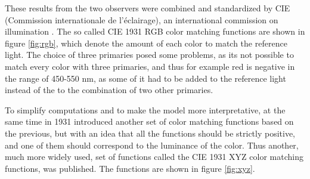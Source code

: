 These results from the two observers were combined and standardized by CIE (Commission internationale de l'éclairage), an international commission on illumination \cite{CIE}. The so called CIE 1931 RGB color matching functions are shown in figure \ref{fig:rgb}, which denote the amount of each color to match the reference light. The choice of three primaries posed some problems, as its not possible to match every color with three primaries, and thus for example red is negative in the range of 450-550 nm, as some of it had to be added to the reference light instead of the to the combination of two other primaries. \cite{measuringcolour}

To simplify computations and to make the model more interpretative, at the same time in 1931 introduced another set of color matching functions based on the previous, but with an idea that all the functions should be strictly positive, and one of them should correspond to the luminance of the color. Thus another, much more widely used, set of functions called the CIE 1931 XYZ color matching functions, was published. The functions are shown in figure \ref{fig:xyz}.




